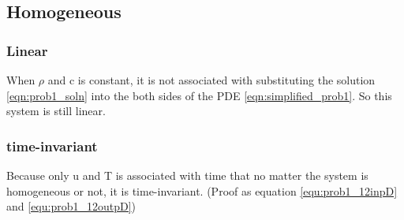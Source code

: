 \documentclass[12pt]{article}
\begin{document}
\subsection*{Homogeneous}
\subsubsection*{Linear}
When $\rho$ and c is constant, it is not associated with substituting the solution \eqref{eqn:prob1_soln} into the both sides of the PDE \eqref{eqn:simplified_prob1}. So this system is still linear.

\subsubsection*{time-invariant}
Because only u and T is associated with time that no matter the system is homogeneous or not, it is time-invariant. (Proof as equation \eqref{equ:prob1_12inpD} and \eqref{equ:prob1_12outpD})
\end{document}
